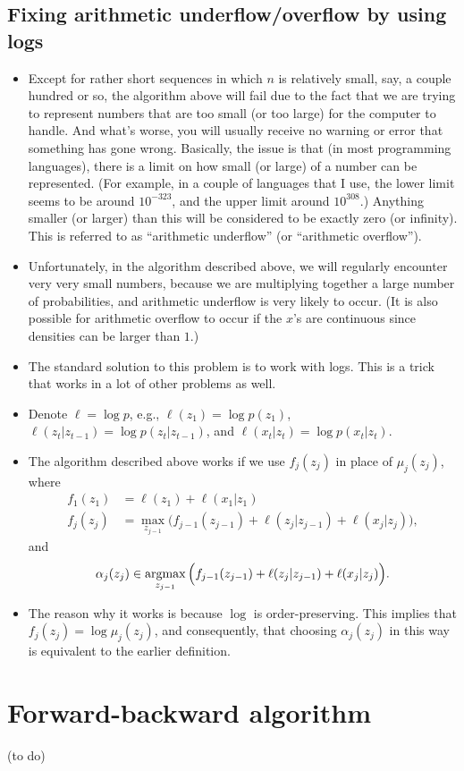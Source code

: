 \documentclass[12pt]{article}
\begin{document}
\subsection{Fixing arithmetic underflow/overflow by using logs}
\begin{itemize}
\item Except for rather short sequences in which $n$ is relatively small, say, a couple hundred or so, the algorithm above will fail due to the fact that we are trying to represent numbers that are too small (or too large) for the computer to handle. And what's worse, you will usually  receive no warning or error that something has gone wrong. Basically, the issue is that (in most programming languages), there is a limit on how small (or large) of a number can be represented. (For example, in a couple of languages that I use, the lower limit seems to be around $10^{-323}$, and the upper limit around $10^{308}$.) Anything smaller (or larger) than this will be considered to be exactly zero (or infinity). This is referred to as ``arithmetic underflow'' (or ``arithmetic overflow'').
\item Unfortunately, in the algorithm described above, we will regularly encounter very very small numbers, because we are multiplying together a large number of probabilities, and arithmetic underflow is very likely to occur.  (It is also possible for arithmetic overflow to occur if the $x$'s are continuous since densities can be larger than $1$.)
\item The standard solution to this problem is to work with logs. This is a trick that works in a lot of other problems as well.
\item Denote $\ell = \log p$, e.g., $\ell(z_1) = \log p(z_1)$, $\ell(z_t | z_{t -1}) = \log p(z_t | z_{t-1})$, and $\ell(x_t | z_t) = \log p(x_t | z_t)$.
\item The algorithm described above works if we use $f_j(z_j)$ in place of $\mu_j(z_j)$, where
\begin{align*}
f_1(z_1) &= \ell(z_1) + \ell(x_1 | z_1) \\
f_j(z_j) &= \max_{z_{j-1}} \Big(f_{j-1}(z_{j-1}) + \ell(z_j | z_{j-1}) + \ell(x_j | z_j) \Big),
\end{align*}
and 
$$ \alpha_j(z_j) \in \operatorname*{argmax}_{z_{j-1}} \Big(f_{j-1}(z_{j-1}) + \ell(z_j | z_{j-1}) + \ell(x_j | z_j) \Big).$$
\item The reason why it works is because $\log$ is order-preserving. This implies that $f_j(z_j) = \log \mu_j(z_j)$, and consequently, that choosing $\alpha_j(z_j)$ in this way is equivalent to the earlier definition.
\end{itemize}






\section{Forward-backward algorithm}

(to do)
\end{document}
